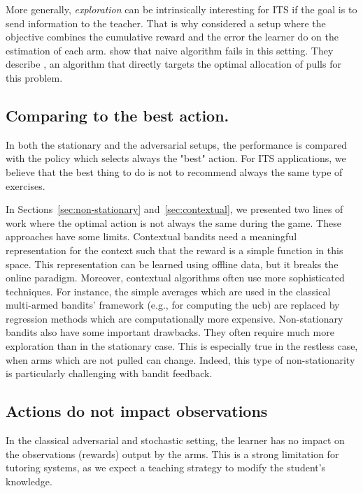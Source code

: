 More generally, \emph{exploration} can be intrinsically interesting for ITS if the goal is to send information to the teacher. That is why \citet{liu2014trading, erraqabi2017trading} considered a setup where the objective combines the cumulative reward and the error the learner do on the estimation of each arm. \citet{erraqabi2017trading} show that naive \UCB algorithm fails in this setting. They describe \ForcingBalance, an algorithm that directly targets the optimal allocation of pulls for this problem. 


\subsection{Comparing to the best action.}
\label{ss:shortcoming-oracle}
In both the stationary and the adversarial setups, the performance is compared with the policy which selects always the "best" action. For ITS applications, we believe that the best thing to do is not to recommend always the same type of exercises. 

In Sections~\ref{sec:non-stationary} and~\ref{sec:contextual}, we presented two lines of work where the optimal action is not always the same during the game. These approaches have some limits. Contextual bandits need a meaningful representation for the context such that the reward is a simple function in this space. This representation can be learned using offline data, but it breaks the online paradigm. Moreover, contextual algorithms often use more sophisticated techniques. For instance, the simple averages which are used in the classical multi-armed bandits' framework (e.g., for computing the ucb) are replaced by regression methods which are computationally more expensive. Non-stationary bandits also have some important drawbacks. They often require much more exploration than in the stationary case. This is especially true in the restless case, when arms which are not pulled can change. Indeed, this type of non-stationarity is particularly challenging with bandit feedback. 

\subsection{Actions do not impact observations}
\label{ss:shortcoming-non-stationary}
In the classical adversarial and stochastic setting, the learner has no impact on the observations (rewards) output by the arms. This is a strong limitation for tutoring systems, as we expect a teaching strategy to modify the student's knowledge. 

